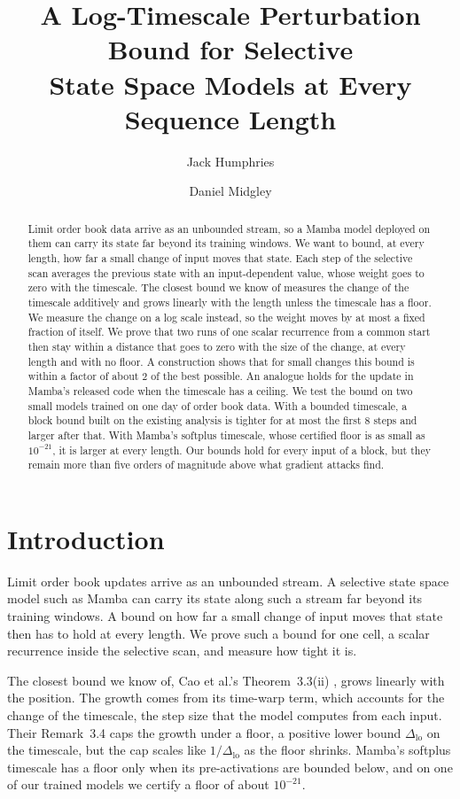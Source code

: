\documentclass[11pt, a4paper]{article}
\title{A Log-Timescale Perturbation Bound for Selective\\ State Space Models at Every Sequence Length}
\author[1]{Jack Humphries}
\author[2]{Daniel Midgley}
\affil[1]{Department of Computer Science, University of Surrey}
\affil[2]{Department of Mathematics, University of Surrey}
\date{}
\theoremstyle{remark}
\theoremstyle{plain}
\begin{document}
\maketitle

\begin{abstract}
\noindent Limit order book data arrive as an unbounded stream, so a Mamba model deployed on them can
carry its state far beyond its training windows. We want to bound, at every length, how far a
small change of input moves that state. Each step of the selective scan averages the previous
state with an input-dependent value, whose weight goes to zero with the timescale. The closest
bound we know of measures the change of the timescale additively and grows linearly with the
length unless the timescale has a floor. We measure the change on a log scale instead, so the
weight moves by at most a fixed fraction of itself. We prove that two runs of one scalar recurrence
from a common start then stay within a distance that goes to zero with the size of the change, at
every length and with no floor. A construction shows that for small changes this bound is within
a factor of about $2$ of the best possible. An analogue holds for the update in Mamba's released
code when the timescale has a ceiling. We test the bound on two small models trained on
one day of order book data. With a bounded timescale, a block bound built on the existing analysis
is tighter for at most the first $8$ steps and larger after that. With Mamba's softplus timescale,
whose certified floor is as small as $10^{-21}$, it is larger at every length. Our bounds hold for
every input of a block, but they remain more than five orders of magnitude above what gradient
attacks find.
\end{abstract}

\section{Introduction}
\label{sec:intro}

Limit order book updates arrive as an unbounded stream. A selective state space model such as
Mamba \citep{gu2023mamba} can carry its state along such a stream far beyond its training windows.
A bound on how far a small change of input moves that state then has to hold at every length. We
prove such a bound for one cell, a scalar recurrence inside the selective scan, and measure how
tight it is.

The closest bound we know of, Cao et al.'s Theorem~3.3(ii) \citep{cao2026control}, grows linearly
with the position. The growth comes from its time-warp term, which accounts for the change of the
timescale, the step size that the model computes from each input. Their Remark~3.4 caps the growth
under a floor, a positive lower bound $\Delta_{\mathrm{lo}}$ on the timescale, but the cap scales
like $1/\Delta_{\mathrm{lo}}$ as the floor shrinks. Mamba's softplus timescale has a floor only
when its pre-activations are bounded below, and on one of our trained models we certify a floor of
about $10^{-21}$.
\end{document}

